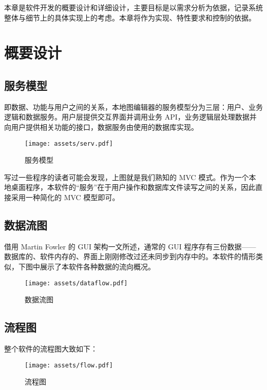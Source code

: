 
本章是软件开发的概要设计和详细设计，主要目标是以需求分析为依据，记录系统整体与细节上的具体实现上的考虑。本章将作为实现、特性要求和控制的依据。

\section{概要设计}

\subsection{服务模型}

即数据、功能与用户之间的关系，本地图编辑器的服务模型分为三层：用户、业务逻辑和数据服务。用户层提供交互界面并调用业务 API，业务逻辑层处理数据并向用户提供相关功能的接口，数据服务由使用的数据库实现。

\begin{figure}[H]
  \centering
  \texttt{[image: assets/serv.pdf]}
  \caption{服务模型}
  \label{fig:serv}
\end{figure}

写过一些程序的读者可能会发现，上图就是我们熟知的 MVC 模式。作为一个本地桌面程序，本软件的``服务''在于用户操作和数据库文件读写之间的关系，因此直接采用一种简化的 MVC 模型即可。

\subsection{数据流图}

借用 Martin Fowler 的 GUI 架构一文\cite{url:uiArchs}所述，通常的 GUI 程序存有三份数据——数据库的、软件内存的、界面上刚刚修改过还未同步到内存中的。本软件的情形类似，下图中展示了本软件各种数据的流向概况。

\begin{figure}[H]
  \centering
  \texttt{[image: assets/dataflow.pdf]}
  \caption{数据流图}
  \label{fig:dataflow}
\end{figure}

\subsection{流程图}

整个软件的流程图大致如下：

\begin{figure}[H]
  \centering
  \texttt{[image: assets/flow.pdf]}
  \caption{流程图}
  \label{fig:flow}
\end{figure}

